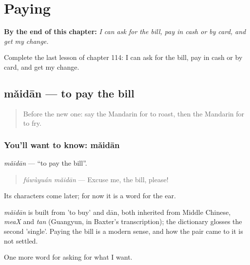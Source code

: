 
\chapter{Paying}
\label{ch:zh-paying}

\begin{chapteropening}
\textbf{By the end of this chapter:} \emph{I can ask for the bill, pay in cash or by card, and get my change.}

Complete the last lesson of chapter 114: I can ask for the bill, pay in cash or by card, and get my change.
\end{chapteropening}

\section[mǎidān]{mǎidān — to pay the bill}

\label{lesson:ZH-C114-maidan}



\begin{quote}
Before the new one: say the Mandarin for to roast, then the Mandarin for to fry.
\end{quote}

\subsection*{You'll want to know: mǎidān}
\emph{mǎidān} — \textquotedblleft{}to pay the bill\textquotedblright{}.

\begin{quote}
\emph{fúwùyuán mǎidān} — Excuse me, the bill, please!
\end{quote}

Its characters come later; for now it is a word for the ear.

\begin{cousinweb}
\emph{mǎidān} is built from  'to buy' and dān, both inherited from Middle Chinese, \emph{meaX} and \emph{tan} (Guangyun, in Baxter's transcription); the dictionary glosses the second 'single'. Paying the bill is a modern sense, and how the pair came to it is not settled.
\end{cousinweb}

\begin{grammarlens}[title={What you've built}]
One more word for asking for what I want.
\end{grammarlens}

